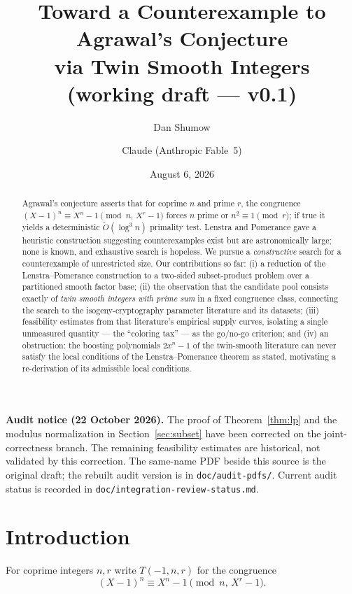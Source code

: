 \documentclass[11pt]{article}
\title{Toward a Counterexample to Agrawal's Conjecture\\
via Twin Smooth Integers\\
\large (working draft --- v0.1)}
\author{Dan Shumow \and Claude (Anthropic Fable~5)}
\date{August 6, 2026}
\theoremstyle{remark}
\begin{document}
\maketitle

\noindent\textbf{Audit notice (22 October 2026).}
The proof of Theorem~\ref{thm:lp} and the modulus normalization in
Section~\ref{sec:subset} have been corrected on the joint-correctness branch.
The remaining feasibility estimates are historical, not validated by this
correction. The same-name PDF beside this source is the original draft;
the rebuilt audit version is in \texttt{doc/audit-pdfs/}. Current audit status
is recorded in \texttt{doc/integration-review-status.md}.

\begin{abstract}
Agrawal's conjecture asserts that for coprime $n$ and prime $r$, the congruence
$(X-1)^n \equiv X^n-1 \pmod{n,\,X^r-1}$ forces $n$ prime or $n^2 \equiv 1
\pmod r$; if true it yields a deterministic $\tilde O(\log^3 n)$ primality
test. Lenstra and Pomerance gave a heuristic construction suggesting
counterexamples exist but are astronomically large; none is known, and
exhaustive search is hopeless. We pursue a \emph{constructive} search for a
counterexample of unrestricted size. Our contributions so far: (i) a reduction
of the Lenstra--Pomerance construction to a two-sided subset-product problem
over a partitioned smooth factor base; (ii) the observation that the candidate
pool consists exactly of \emph{twin smooth integers with prime sum} in a fixed
congruence class, connecting the search to the isogeny-cryptography parameter
literature and its datasets; (iii) feasibility estimates from that literature's
empirical supply curves, isolating a single unmeasured quantity --- the
``coloring tax'' --- as the go/no-go criterion; and (iv) an obstruction: the
boosting polynomials $2x^n-1$ of the twin-smooth literature can never satisfy
the local conditions of the Lenstra--Pomerance theorem as stated, motivating a
re-derivation of its admissible local conditions.
\end{abstract}

\section{Introduction}

For coprime integers $n, r$ write $T(-1,n,r)$ for the congruence
\begin{equation}\label{eq:aks}
(X-1)^n \equiv X^n - 1 \pmod{n,\, X^r-1}.
\end{equation}
\end{document}
